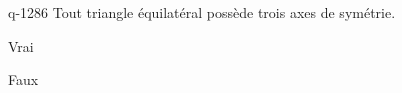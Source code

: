 \begin{truefalse}{q-1286}
Tout triangle équilatéral possède trois axes de symétrie.
\item* Vrai
\item Faux
\end{truefalse}

